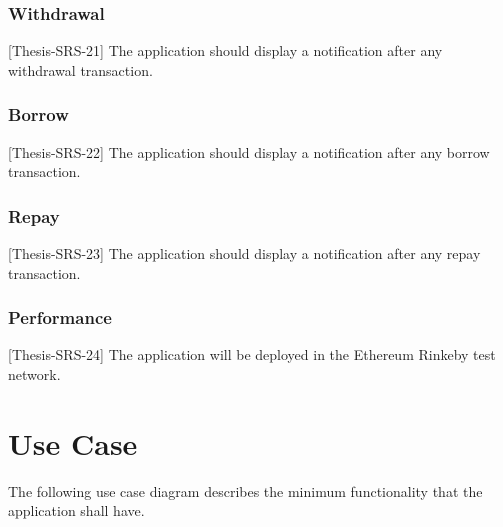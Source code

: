 \documentclass[11pt,a4paper]{report}
\begin{document}
\subsubsection{Withdrawal}
[Thesis-SRS-21] The application should display a notification after any withdrawal transaction.
\subsubsection{Borrow}
[Thesis-SRS-22] The application should display a notification after any borrow transaction.
\subsubsection{Repay}
[Thesis-SRS-23] The application should display a notification after any repay transaction.
\subsubsection{Performance}
[Thesis-SRS-24] The application will be deployed in the Ethereum Rinkeby test network.

\newpage
\section{Use Case}
The following use case diagram describes the minimum functionality that the application shall have.
\end{document}
